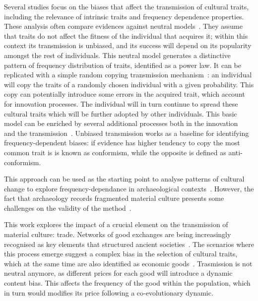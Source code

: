 \documentclass{wscpaperproc}
\begin{document}
Several studies focus on the biases that affect the transmission of cultural traits, including the relevance of intrinsic traits and frequency dependence properties. These analysis often compare evidences against neutral models~\cite{neiman_stylistic_1995}. They assume that traits do not affect the fitness of the individual that acquires it; within this context its transmission is unbiased, and its success will depend on its popularity amongst the rest of individuals. This neutral model generates a distinctive pattern of frequency distribution of traits, identified as a power law. It can be replicated with a simple random copying transmission mechanism~\cite{bentley_random_2004}: an individual will copy the traits of a randomly chosen individual with a given probability. This copy can potentially introduce some errors in the acquired trait, which account for innovation processes. The individual will in turn continue to spread these cultural traits which will be further adopted by other individuals. This basic model can be enriched by several additional processes both in the innovation~ and the transmission~\cite{heyes_social_1994,henrich_evolution_2003}. Unbiased transmission works as a baseline for identifying frequency-dependent biases: if evidence has higher tendency to copy the most common trait is is known as conformism, while the opposite is defined as anti-conformism.

This approach can be used as the starting point to analyse patterns of cultural change to explore frequency-dependance in archaeological contexts~\cite{lipo_neutralitystyle_2001,shennan_ceramic_2001,steele_ceramic_2010}. However, the fact that archaeology records fragmented material culture presents some challenges on the validity of the method~\cite{kandler_nonequilibrium_2013,porcic_exploring_2014,crema_approximate_2014}.

This work explores the impact of a crucial element on the transmission of material culture: trade. Networks of good exchanges are being increasingly recognised as key elements that structured ancient societies~. The scenarios where this process emerge suggest a complex bias in the selection of cultural traits, which at the same time are also identified as economic goods~\cite{bentley_specialisation_2005,macmillan_agent-based_2008}. Trasmission is not neutral anymore, as different prices for each good will introduce a dynamic content bias. This affects the frequency of the good within the population, which in turn would modifies its price following a co-evolutionary dynamic.
\end{document}
